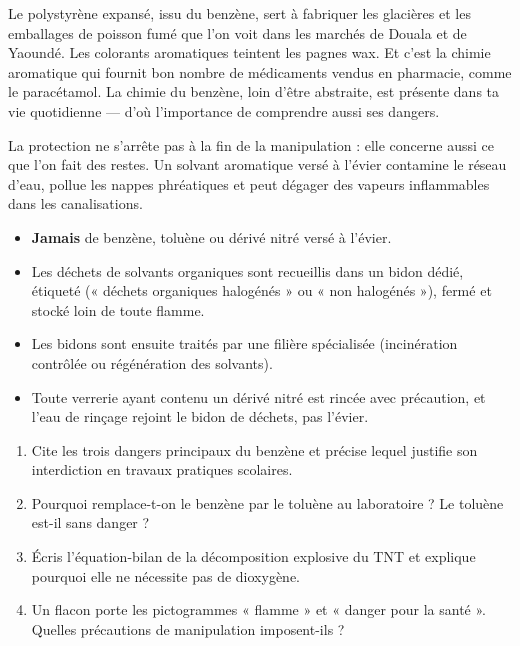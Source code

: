 \documentclass[11pt]{article}
\newcommand{\cle}[1]{{\popxbold\color{popdark}#1}}
\newcounter{popsec}
\newcounter{popsub}
\newcommand{\courssub}[1]{%
  \stepcounter{popsub}%
  \par\vspace{9pt}\noindent{\popxbold\fontsize{11.5}{13}\selectfont\color{popink}{\color{poporange}\thepopsec.\thepopsub}\hspace{6pt}#1}\par\nopagebreak\vspace{4pt}
}
\begin{document}
\begin{savaistu}
Le polystyrène expansé, issu du benzène, sert à fabriquer les glacières et les emballages de poisson fumé que l'on voit dans les marchés de Douala et de Yaoundé. Les colorants aromatiques teintent les pagnes wax. Et c'est la chimie aromatique qui fournit bon nombre de médicaments vendus en pharmacie, comme le paracétamol. La chimie du benzène, loin d'être abstraite, est présente dans ta vie quotidienne — d'où l'importance de comprendre aussi ses dangers.
\end{savaistu}

\courssub{Gestion des déchets au laboratoire}

La protection ne s'arrête pas à la fin de la manipulation : elle concerne aussi ce que l'on fait des restes. Un solvant aromatique versé à l'évier contamine le réseau d'eau, pollue les nappes phréatiques et peut dégager des vapeurs inflammables dans les canalisations.

\begin{aretenir}
\begin{itemize}
\item \textbf{Jamais} de benzène, toluène ou dérivé nitré versé à l'évier.
\item Les déchets de solvants organiques sont recueillis dans un \cle{bidon dédié}, étiqueté (« déchets organiques halogénés » ou « non halogénés »), fermé et stocké loin de toute flamme.
\item Les bidons sont ensuite traités par une filière spécialisée (incinération contrôlée ou régénération des solvants).
\item Toute verrerie ayant contenu un dérivé nitré est rincée avec précaution, et l'eau de rinçage rejoint le bidon de déchets, pas l'évier.
\end{itemize}
\end{aretenir}

\begin{exercice}
\begin{enumerate}
\item Cite les trois dangers principaux du benzène et précise lequel justifie son interdiction en travaux pratiques scolaires.
\item Pourquoi remplace-t-on le benzène par le toluène au laboratoire ? Le toluène est-il sans danger ?
\item Écris l'équation-bilan de la décomposition explosive du TNT et explique pourquoi elle ne nécessite pas de dioxygène.
\item Un flacon porte les pictogrammes « flamme » et « danger pour la santé ». Quelles précautions de manipulation imposent-ils ?
\end{enumerate}
\end{exercice}
\end{document}
